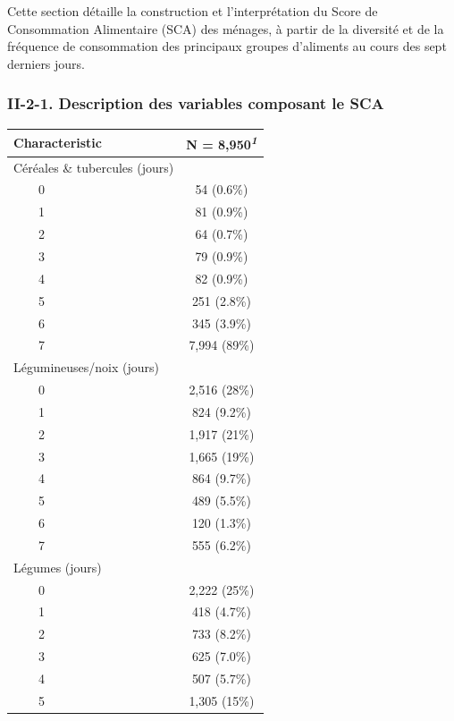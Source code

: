 \documentclass[
]{article}
\begin{document}
Cette section détaille la construction et l'interprétation du Score de
Consommation Alimentaire (SCA) des ménages, à partir de la diversité et
de la fréquence de consommation des principaux groupes d'aliments au
cours des sept derniers jours.

\hypertarget{ii-2-1.-description-des-variables-composant-le-sca}{%
\subsubsection{II-2-1. Description des variables composant le
SCA}\label{ii-2-1.-description-des-variables-composant-le-sca}}

\begin{table}[!t]
\fontsize{9.8pt}{11.7pt}\selectfont
\begin{tabular*}{\linewidth}{@{\extracolsep{\fill}}lc}
\toprule
\textbf{Characteristic} & \textbf{N = 8,950}\textsuperscript{\textit{1}} \\ 
\midrule\addlinespace[2.5pt]
Céréales \& tubercules (jours) &  \\ 
    0 & 54 (0.6\%) \\ 
    1 & 81 (0.9\%) \\ 
    2 & 64 (0.7\%) \\ 
    3 & 79 (0.9\%) \\ 
    4 & 82 (0.9\%) \\ 
    5 & 251 (2.8\%) \\ 
    6 & 345 (3.9\%) \\ 
    7 & 7,994 (89\%) \\ 
Légumineuses/noix (jours) &  \\ 
    0 & 2,516 (28\%) \\ 
    1 & 824 (9.2\%) \\ 
    2 & 1,917 (21\%) \\ 
    3 & 1,665 (19\%) \\ 
    4 & 864 (9.7\%) \\ 
    5 & 489 (5.5\%) \\ 
    6 & 120 (1.3\%) \\ 
    7 & 555 (6.2\%) \\ 
Légumes (jours) &  \\ 
    0 & 2,222 (25\%) \\ 
    1 & 418 (4.7\%) \\ 
    2 & 733 (8.2\%) \\ 
    3 & 625 (7.0\%) \\ 
    4 & 507 (5.7\%) \\ 
    5 & 1,305 (15\%) \\ 

\end{tabular*}
\end{table}
\end{document}
